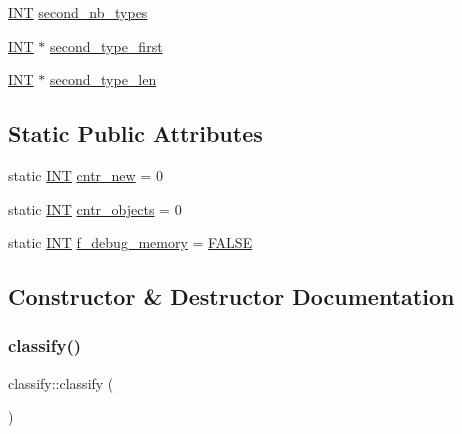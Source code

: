 \begin{DoxyCompactItemize}
\item 
\mbox{\hyperlink{galois_8h_a09fddde158a3a20bd2dcadb609de11dc}{I\+NT}} \mbox{\hyperlink{classclassify_a5c6780c483021fc763b41fdf883a7641}{second\+\_\+nb\+\_\+types}}
\item 
\mbox{\hyperlink{galois_8h_a09fddde158a3a20bd2dcadb609de11dc}{I\+NT}} $\ast$ \mbox{\hyperlink{classclassify_a0e1ea1737130e2fe43fe71b10137d237}{second\+\_\+type\+\_\+first}}
\item 
\mbox{\hyperlink{galois_8h_a09fddde158a3a20bd2dcadb609de11dc}{I\+NT}} $\ast$ \mbox{\hyperlink{classclassify_a48b9d0a9ad491a40a083ab6fd2e68848}{second\+\_\+type\+\_\+len}}
\end{DoxyCompactItemize}
\subsection*{Static Public Attributes}
\begin{DoxyCompactItemize}
\item 
static \mbox{\hyperlink{galois_8h_a09fddde158a3a20bd2dcadb609de11dc}{I\+NT}} \mbox{\hyperlink{classclassify_a172d9e728ccc4dfae010580064f67d8a}{cntr\+\_\+new}} = 0
\item 
static \mbox{\hyperlink{galois_8h_a09fddde158a3a20bd2dcadb609de11dc}{I\+NT}} \mbox{\hyperlink{classclassify_ae96859bdf091e3648ccf286dda89c60d}{cntr\+\_\+objects}} = 0
\item 
static \mbox{\hyperlink{galois_8h_a09fddde158a3a20bd2dcadb609de11dc}{I\+NT}} \mbox{\hyperlink{classclassify_af8a0386d4b16350d18c7372d1b638124}{f\+\_\+debug\+\_\+memory}} = \mbox{\hyperlink{nauty_8h_aa93f0eb578d23995850d61f7d61c55c1}{F\+A\+L\+SE}}
\end{DoxyCompactItemize}


\subsection{Constructor \& Destructor Documentation}
\mbox{\label{classclassify_ae35e10397862d6e00e631dcc9290157c}} 
\subsubsection{\texorpdfstring{classify()}{classify()}}
{\footnotesize\ttfamily classify\+::classify (\begin{DoxyParamCaption}{ }\end{DoxyParamCaption})}

